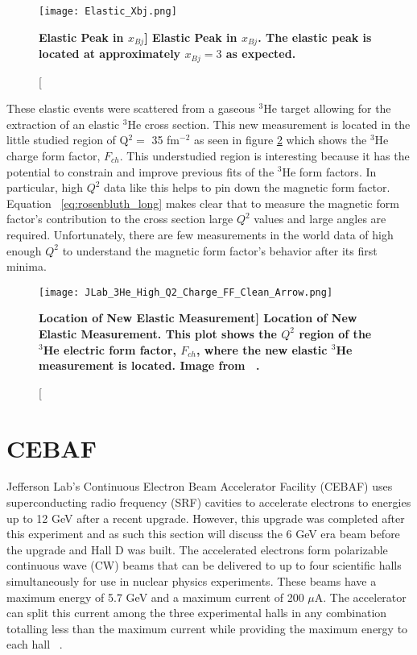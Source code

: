 \begin{figure}[!ht]
\begin{center}
\texttt{[image: Elastic\_Xbj.png]}
\end{center}
\caption[\bf{Elastic Peak in $x_{Bj}$}]{
{\bf{Elastic Peak in $x_{Bj}$.}} The elastic peak is located at approximately $x_{Bj}=3$ as expected.}
\label{fig:elastic_xbj}
\end{figure}

These elastic events were scattered from a gaseous $^3$He target allowing for the extraction of an elastic $^3$He cross section. This new measurement is located in the little studied region of Q$^2 = $ 35 fm$^{-2}$ as seen in figure \ref{fig:jlab_3he} which shows the $^3$He charge form factor, $F_{ch}$. This understudied region is interesting because it has the potential to constrain and improve previous fits of the $^3$He form factors. In particular, high $Q^2$ data like this helps to pin down the magnetic form factor. Equation ~\ref{eq:rosenbluth_long} makes clear that to measure the magnetic form factor's contribution to the cross section large $Q^2$ values and large angles are required. Unfortunately, there are few measurements in the world data of high enough $Q^2$ to understand the magnetic form factor's behavior after its first minima. 

\begin{figure}[!ht]
\begin{center}
\texttt{[image: JLab\_3He\_High\_Q2\_Charge\_FF\_Clean\_Arrow.png]}
\end{center}
\caption[\bf{Location of New Elastic Measurement}]{
{\bf{Location of New Elastic Measurement.}} This plot shows the $Q^2$ region of the $^3$He electric form factor, $F_{ch}$, where the new elastic $^3$He measurement is located. Image from ~\cite{Article:Alex}.}
\label{fig:jlab_3he}
\end{figure}

\section{CEBAF}
\label{sec:CEBAF}

Jefferson Lab's Continuous Electron Beam Accelerator Facility (CEBAF) uses superconducting radio frequency (SRF) cavities to accelerate electrons to energies up to 12 GeV after a recent upgrade. However, this upgrade was completed after this experiment and as such this section will discuss the 6 GeV era beam before the upgrade and Hall D was built. The accelerated electrons form polarizable continuous wave (CW) beams that can be delivered to up to four scientific halls simultaneously for use in nuclear physics experiments. These beams have a maximum energy of 5.7 GeV and a maximum current of 200 $\mu$A. The accelerator can split this current among the three experimental halls in any combination totalling less than the maximum current while providing the maximum energy to each hall ~\cite{Article:CEBAF}.

